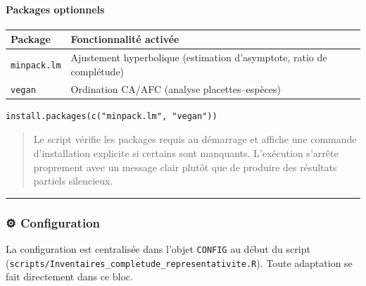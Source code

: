 \paragraph{Packages optionnels}\label{packages-optionnels}

{\def\LTcaptype{none} %
\begin{longtable}[]{@{}
  >{\raggedright\arraybackslash}p{}
  >{\raggedright\arraybackslash}p{}@{}}
\toprule\noalign{}
\begin{minipage}[b]{\linewidth}\raggedright
Package
\end{minipage} & \begin{minipage}[b]{\linewidth}\raggedright
Fonctionnalité activée
\end{minipage} \\
\midrule\noalign{}
\endhead
\bottomrule\noalign{}
\endlastfoot
\texttt{minpack.lm} & Ajustement hyperbolique (estimation d'asymptote,
ratio de complétude) \\
\texttt{vegan} & Ordination CA/AFC (analyse placettes--espèces) \\
\end{longtable}
}

\begin{verbatim}
install.packages(c("minpack.lm", "vegan"))
\end{verbatim}

\begin{quote}
Le script vérifie les packages requis au démarrage et affiche une
commande d'installation explicite si certains sont manquants.
L'exécution s'arrête proprement avec un message clair plutôt que de
produire des résultats partiels silencieux.
\end{quote}

\begin{center}\rule{0.5\linewidth}{0.5pt}\end{center}

\subsubsection{⚙️ Configuration}\label{configuration}

La configuration est centralisée dans l'objet \texttt{CONFIG} au début
du script
(\texttt{scripts/Inventaires\_completude\_representativite.R}). Toute
adaptation se fait directement dans ce bloc.

